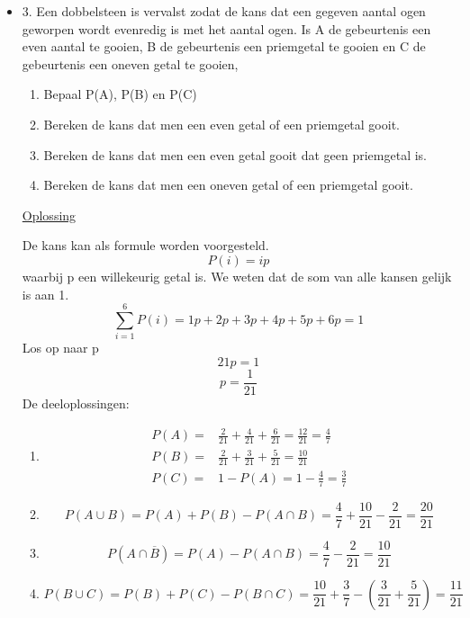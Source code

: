 \documentclass[12pt]{report}
\newcommand{\exercise}[2]{
  #1
  

  \underline{Oplossing}
  
  #2
  
    \hrulefill
}
\begin{document}
\begin{itemize}[label={}, leftmargin=*]
	    
	\item { \exercise{3. Een dobbelsteen is vervalst zodat de kans dat een gegeven aantal ogen geworpen wordt evenredig is met het aantal ogen. Is A de gebeurtenis een even aantal te gooien, B de gebeurtenis een priemgetal te gooien en C de gebeurtenis een oneven getal te gooien,
		\begin{enumerate}
			\item Bepaal P(A), P(B) en P(C)
			\item Bereken de kans dat men een even getal of een priemgetal gooit.
			\item Bereken de kans dat men een even getal gooit dat geen priemgetal is.
			\item Bereken de kans dat men een oneven getal of een priemgetal gooit.
		\end{enumerate}}
		{
			De kans kan als formule worden voorgesteld.
			$$P(i) = ip$$
			waarbij p een willekeurig getal is.
			We weten dat de som van alle kansen gelijk is aan 1.
			$$\sum_{i = 1}^{6} P(i) = 1p + 2p + 3p + 4p + 5p + 6p = 1$$
			Los op naar p
			$$21p = 1$$
			$$p = \frac{1}{21}$$
			De deeloplossingen:
			\begin{enumerate}
				\item   \begin{equation*}
				      \begin{split}
				      	P(A) = & \frac{2}{21} + \frac{4}{21} + \frac{6}{21} = \frac{12}{21} = \frac{4}{7}\\
				      	P(B) = &\frac{2}{21} + \frac{3}{21} + \frac{5}{21} = \frac{10}{21}\\
				      	P(C) = & 1 - P(A) = 1 - \frac{4}{7} = \frac{3}{7}
				      \end{split}
				\end{equation*}
				\item $$P(A\cup B) = P(A) + P(B) - P(A \cap B) = \frac{4}{7} +\frac{10}{21} - \frac{2}{21} = \frac{20}{21}$$
				\item $$P(A \cap \overline{B}) = P(A) - P(A \cap B) = \frac{4}{7} - \frac{2}{21} = \frac{10}{21}$$
				\item $$P(B \cup C) = P(B) + P(C) - P(B \cap C) = \frac{10}{21} + \frac{3}{7} - (\frac{3}{21} + \frac{5}{21}) = \frac{11}{21}$$
			\end{enumerate}}}
	  

\end{itemize}
\end{document}
